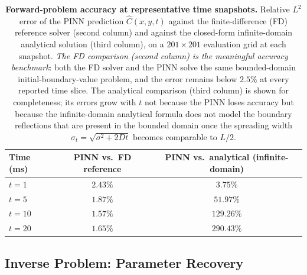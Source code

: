 \documentclass[12pt]{article}
\begin{document}
\begin{table}[h!]
\centering
\caption{\textbf{Forward-problem accuracy at representative
time snapshots.}
Relative $L^2$ error of the PINN prediction $\hat{C}(x, y, t)$
against the finite-difference (FD) reference solver (second
column) and against the closed-form infinite-domain analytical
solution (third column), on a $201 \times 201$ evaluation grid
at each snapshot. \emph{The FD comparison (second column) is
the meaningful accuracy benchmark}: both the FD solver and the
PINN solve the same bounded-domain initial-boundary-value
problem, and the error remains below $2.5\%$ at every reported
time slice. The analytical comparison (third column) is shown
for completeness; its errors grow with $t$ not because the PINN
loses accuracy but because the infinite-domain analytical
formula does not model the boundary reflections that are
present in the bounded domain once the spreading width
$\sigma_t = \sqrt{\sigma^2 + 2Dt}$ becomes comparable to
$L/2$.}
\label{tab:forward_error}
\begin{tabular}{lcc}
\toprule
\textbf{Time (ms)} & \textbf{PINN vs.\ FD reference}
                    & \textbf{PINN vs.\ analytical (infinite-domain)} \\
\midrule
$t = 1$   & $2.43\%$    & $3.75\%$   \\
$t = 5$   & $1.87\%$    & $51.97\%$  \\
$t = 10$  & $1.57\%$    & $129.26\%$ \\
$t = 20$  & $1.65\%$    & $290.43\%$ \\
\bottomrule
\end{tabular}
\end{table}

\subsection{Inverse Problem: Parameter Recovery}
\label{sec:res_inverse}
\end{document}
